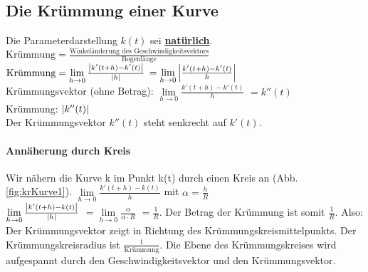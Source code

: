 \subsection{Die Krümmung einer Kurve}
Die Parameterdarstellung $k(t)$ sei \underline{\textbf{natürlich}}. \\
$ \textrm{Krümmung} = \frac{\textrm{Winkeländerung des Geschwindigkeitsvektors}}{\textrm{Bogenlänge}}$\\
$ \textrm{Krümmung} = \lim\limits_{h\rightarrow 0} \frac{ \left\vert k'(t+h) - k'(t) \right\vert }{ \left\vert h \right\vert } $ 
$ = \lim\limits_{h\rightarrow 0}  \left\vert \frac{k'(t+h) - k'(t)}{h} \right\vert $\\
Krümmungsvektor (ohne Betrag): $\lim\limits_{h\rightarrow 0} \frac{k'(t+h) - k'(t)}{h}$
\underline{$ = k''(t)$}\\
Krümmung: $ \left\vert k''(t) \right\vert $\\
Der Krümmungsvektor $k''(t) $ steht senkrecht auf $k'(t)$. 

\paragraph{Annäherung durch Kreis}
Wir nähern die Kurve k im Punkt k(t) durch einen Kreis an (Abb. \ref{fig:krKurve1}). 
$\lim\limits_{h\rightarrow 0} \frac{k'(t+h) - k(t)}{h} $ mit $\alpha = \frac{h}{R}$\\
$\lim\limits_{h\rightarrow 0} \frac{ \left\vert k'(t+h) - k(t) \right\vert }{ \left\vert h \right\vert } $
$=\lim\limits_{h\rightarrow 0} \frac{\alpha}{\alpha \cdot R} $
$=\frac{1}{R}$. Der Betrag der Krümmung ist somit $\frac{1}{R}$. Also:\\
Der Krümmungsvektor zeigt in Richtung des Krümmungskreismittelpunkts. 
Der Krümmungskreisradius ist $\frac{1}{\textrm{Krümmung}}$. Die Ebene des Krümmungskreises wird aufgespannt durch den Geschwindigkeitsvektor und den Krümmungsvektor. 
